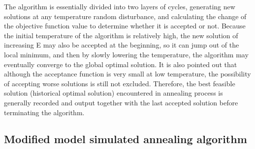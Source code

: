 \documentclass{mcmthesis}
\begin{document}
\noindent The algorithm is essentially divided into two layers of cycles, generating new solutions at any temperature random disturbance, and calculating the change of the objective function value to determine whether it is accepted or not. Because the initial temperature of the algorithm is relatively high, the new solution of increasing E may also be accepted at the beginning, so it can jump out of the local minimum, and then by slowly lowering the temperature, the algorithm may eventually converge to the global optimal solution. It is also pointed out that although the acceptance function is very small at low temperature, the possibility of accepting worse solutions is still not excluded. Therefore, the best feasible solution (historical optimal solution) encountered in annealing process is generally recorded and output together with the last accepted solution before terminating the algorithm.

\subsection{Modified model simulated annealing algorithm }
\end{document}
